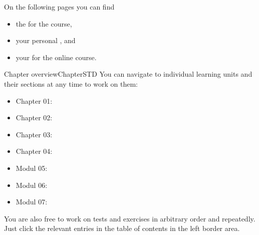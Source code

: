 \ifttm
\MSetSubject{\MINTPhysics}

\begin{MSectionStart}
On the following pages you can find
\begin{itemize}
\item{the  for the course,}
\item{your personal ,} and
\item{your  for the online course.}
\end{itemize}
\end{MSectionStart}


\begin{MXContent}{Chapter overview}{Chapter}{STD}
\MGlobalChapterTag
You can navigate to individual learning units and their sections at any time to work on them:
\begin{itemize}
\item{Chapter 01: }
\item{Chapter 02: }
\item{Chapter 03: }
\item{Chapter 04: }
\item{Modul 05: }
\item{Modul 06: }
\item{Modul 07: }
\end{itemize}
You are also free to work on tests and exercises in arbitrary order and repeatedly.
Just click the relevant entries in the table of contents in the left border area.
\end{MXContent}


